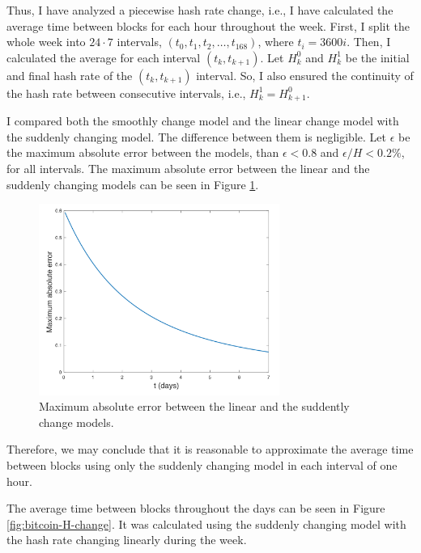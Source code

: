 Thus, I have analyzed a piecewise hash rate change, i.e., I have calculated the average time between blocks for each hour throughout the week. First, I split the whole week into $24 \cdot 7$ intervals, $(t_0, t_1, t_2, \dots, t_168)$, where $t_i = 3600i$. Then, I calculated the average for each interval $(t_k, t_{k+1})$. Let $H_k^0$ and $H_k^1$ be the initial and final hash rate of the $(t_k, t_{k+1})$ interval. So, I also ensured the continuity of the hash rate between consecutive intervals, i.e., $H_k^1 = H_{k+1}^0$.

I compared both the smoothly change model and the linear change model with the suddenly changing model. The difference between them is negligible. Let $\epsilon$ be the maximum absolute error between the models, than $\epsilon < 0.8$ and $\epsilon/H < 0.2\%$, for all intervals. The maximum absolute error between the linear and the suddenly changing models can be seen in Figure \ref{fig:bitcoin-H-change-error}.

\begin{figure}[!htb]
\centering \includegraphics[width=0.7\textwidth]{./images01/H-max-abs-error.png}

\caption{Maximum absolute error between the linear and the suddently change models. \label{fig:bitcoin-H-change-error}}
\end{figure}

Therefore, we may conclude that it is reasonable to approximate the average time between blocks using only the suddenly changing model in each interval of one hour.

The average time between blocks throughout the days can be seen in Figure \ref{fig:bitcoin-H-change}. It was calculated using the suddenly changing model with the hash rate changing linearly during the week.

